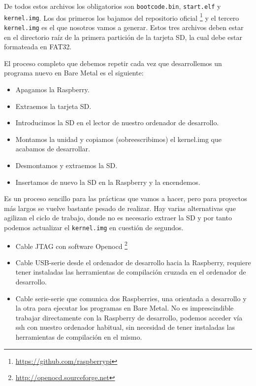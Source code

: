 De todos estos archivos los obligatorios son {\tt bootcode.bin}, {\tt start.elf} y
{\tt kernel.img}. Los dos primeros los bajamos del repositorio oficial
\footnote{\url{https://github.com/raspberrypi}} y el tercero {\tt kernel.img} es el que nosotros
vamos a generar. Estos tres archivos deben estar en el directorio raíz de la primera partición
de la tarjeta SD, la cual debe estar formateada en FAT32.

El proceso completo que debemos repetir cada vez que desarrollemos un programa nuevo
en Bare Metal es el siguiente:

\begin{itemize}
  \item Apagamos la Raspberry.
  \item Extraemos la tarjeta SD.
  \item Introducimos la SD en el lector de nuestro ordenador de desarrollo.
  \item Montamos la unidad y copiamos (sobreescribimos) el kernel.img que acabamos
        de desarrollar.
  \item Desmontamos y extraemos la SD.
  \item Insertamos de nuevo la SD en la Raspberry y la encendemos.
\end{itemize}

Es un proceso sencillo para las prácticas que vamos a hacer, pero para proyectos más largos
se vuelve bastante pesado de realizar. Hay varias alternativas que agilizan el ciclo de
trabajo, donde no es necesario extraer la SD y por tanto podemos actualizar el {\tt kernel.img}
en cuestión de segundos.

\begin{itemize}
  \item Cable JTAG con software Openocd \footnote{\url{http://openocd.sourceforge.net}}
  \item Cable USB-serie desde el ordenador de desarrollo hacia la Raspberry, requiere
        tener instaladas las herramientas de compilación cruzada en el ordenador de desarrollo.
  \item Cable serie-serie que comunica dos Raspberries, una orientada a desarrollo y la otra
        para ejecutar los programas en Bare Metal. No es imprescindible trabajar directamente
        con la Raspberry de desarrollo, podemos acceder vía ssh con nuestro ordenador habitual,
        sin necesidad de tener instaladas las herramientas de compilación en el mismo.
\end{itemize}

